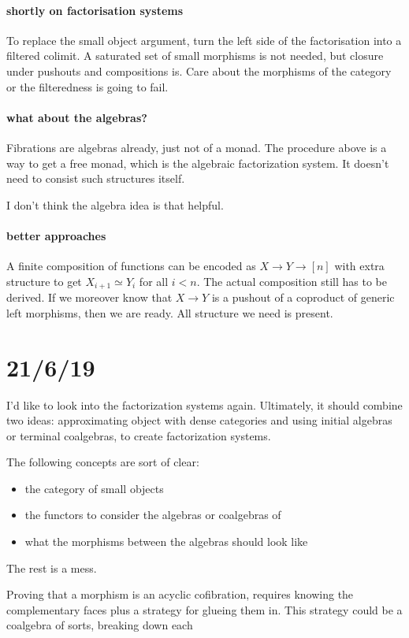 \documentclass[csh.tex]{subfiles}
\begin{document}
\paragraph{shortly on factorisation systems}
To replace the small object argument, turn the left side of the factorisation
into a filtered colimit. A saturated set of small morphisms is not needed,
but closure under pushouts and compositions is. Care about the morphisms of
the category or the filteredness is going to fail.

\paragraph{what about the algebras?}
Fibrations are algebras already, just not of a monad. The procedure above is
a way to get a free monad, which is the algebraic factorization system. It
doesn't need to consist such structures itself.

I don't think the algebra idea is that helpful.

\paragraph{better approaches}
A finite composition of functions can be encoded as $X \to Y \to [n]$ with
extra structure to get $X_{i+1}\simeq Y_i$ for all $i<n$. The actual composition
still has to be derived. If we moreover know that $X\to Y$ is a pushout of a
coproduct of generic left morphisms, then we are ready. All structure we need 
is present.

\section{21/6/19}
I'd like to look into the factorization systems again. Ultimately, it should
combine two ideas: approximating object with dense categories and using
initial algebras or terminal coalgebras, to create factorization systems.

The following concepts are sort of clear:
\begin{itemize}
  \item the category of small objects
  \item the functors to consider the algebras or coalgebras of
  \item what the morphisms between the algebras should look like
\end{itemize}

The rest is a mess.

Proving that a morphism is an acyclic cofibration, requires knowing the
complementary faces plus a strategy for glueing them in. This strategy 
could be a coalgebra of sorts, breaking down each 
\end{document}
